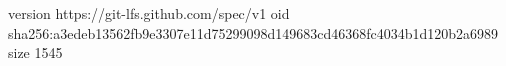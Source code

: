 version https://git-lfs.github.com/spec/v1
oid sha256:a3edeb13562fb9e3307e11d75299098d149683cd46368fc4034b1d120b2a6989
size 1545

